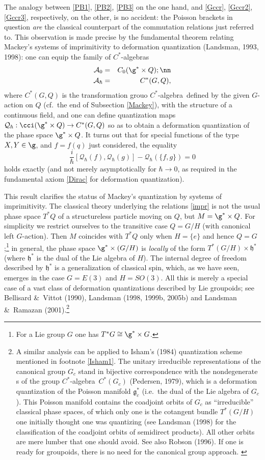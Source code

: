 \documentclass[12pt,titlepage]{article}
\newcommand{\ca}{$C^*$-algebra} \newcommand{\jba}{JB-algebra}
\newcommand{\irrep}{irreducible representation}
\newcommand{\raw}{\rightarrow} \newcommand{\rat}{\mapsto}
\newcommand{\x}{\times} \newcommand{\hb}{\hbar}
\newcommand{\qh}{q_{\hbar}} \newcommand{\sgh}{\sigma_{\hbar}}
\newcommand{\er}{\eqref}
\newcommand{\h}{\mathfrak{h}}
\newcommand{\CA}{{\mathcal A}} \newcommand{\CB}{{\mathcal B}}
\newcommand{\CQ}{{\mathcal Q}} \newcommand{\CR}{{\mathcal R}}
\renewcommand{\qh}{\CQ_{\hbar}}
\begin{document}
The analogy between \er{PB1}, \er{PB2},  \er{PB3} on the one hand, and  \er{Gccr},  \er{Gccr2},  \er{Gccr3}, respectively, on the other, is no accident: the Poisson brackets in question {\it are} the  classical counterpart  of the commutation relations just referred to. This observation is made precise by the fundamental theorem relating Mackey's systems of imprimitivity to deformation quantization (Landsman, 1993, 1998): one can equip the family of \ca s 
\begin{eqnarray}
\CA_0 &=& C_0(\g^*\times Q); \nn\\
\CA_{\hbar} &=& C^*(G,Q),
\end{eqnarray}
  where $C^*(G,Q)$ is the transformation grouo \ca\ defined by the given $G$-action on $Q$ (cf.\ the end of Subsection \ref{Mackey}), with the structure of a continuous field, and one can define quantization maps $\qh:\cci(\g^*\times Q)\raw C^*(G,Q)$ so as to obtain a deformation quantization of the phase space $\g^*\x Q$. It turns out that for special functions of the type $X,Y\in\g$, and $f=f(q)$ just considered, the equality
  \begin{equation}
\frac{i}{\hbar}[\CQ_{\hbar}(f),\CQ_{\hbar}(g)]-\CQ_{\hbar}(\{f,g\}) =0 \label{Diracexact}
\end{equation}
  holds  exactly (and  not merely asymptotically for $\hbar\raw 0$, as required in the fundamental axiom \er{Dirac} for deformation quantization).
  
 This result clarifies the status of Mackey's quantization by systems of imprimitivity. The classical theory underlying the relations \er{impr} is not the usual phase space $T^*Q$ of a structureless particle moving on $Q$, but $M=\g^*\times Q$. For simplicity we restrict ourselves to the transitive case $Q=G/H$ (with canonical left $G$-action). Then $M$ coincides with $T^*Q$ only when $H=\{e\}$ and hence $Q=G$;\footnote{For a Lie group $G$ one has $T^*G\cong \g^*\x G$.} in general, the phase space $\g^*\times (G/H)$ is {\it locally} of the form $T^*(G/H)\x\h^*$ (where $\h^*$ is the dual of the Lie algebra of $H$). The internal degree of freedom described by $\h^*$ is a generalization of classical spin, which, as we have seen, emerges in the case $G=E(3)$ and $H=SO(3)$. All this is merely a special case of a vast class of deformation quantizations described by Lie groupoids; see Bellisard \&\ Vittot (1990),  Landsman (1998, 1999b, 2005b) and Landsman \&\ Ramazan (2001).\footnote{A similar analysis can be applied to Isham's (1984) quantization scheme mentioned in footnote \ref{Isham1}. The unitary \irrep s of the canonical group $G_c$ stand in bijective correspondence with the nondegenerate \rep s of the group \ca\ $C^*(G_c)$ (Pedersen, 1979), which is a deformation quantization of 
 the Poisson manifold $\mathfrak{g}^*_c$ (i.e.\  the dual  of the Lie algebra of $G_c$).
This Poisson manifold contains the coadjoint orbits of $G_c$ as ``irreducible'' classical phase spaces, of which only one is the cotangent bundle $T^*(G/H)$ one initially thought one was quantizing (see Landsman (1998) for the classification of the coadjoint orbits of semidirect products). All other orbits are mere lumber that one should avoid. See also Robson (1996). If one is ready for groupoids, there is no need for the canonical group approach. \label{Isham2}}
\end{document}
